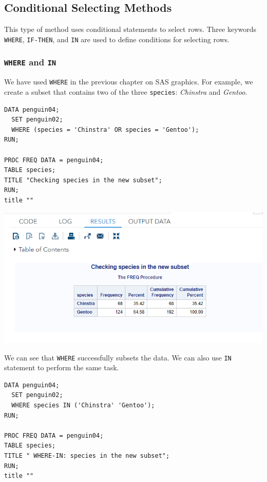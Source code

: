 \documentclass[
]{book}
\begin{document}
\hypertarget{conditional-selecting-methods}{%
\subsection{Conditional Selecting Methods}\label{conditional-selecting-methods}}

This type of method uses conditional statements to select rows. Three keywords \texttt{WHERE}, \texttt{IF-THEN}, and \texttt{IN} are used to define conditions for selecting rows.

\hypertarget{where-and-in}{%
\subsubsection{\texorpdfstring{\texttt{WHERE} and \texttt{IN}}{WHERE and IN}}\label{where-and-in}}

We have used \texttt{WHERE} in the previous chapter on SAS graphics. For example, we create a subset that contains two of the three \texttt{species}: \emph{Chinstra} and \emph{Gentoo}.

\begin{verbatim}
DATA penguin04;
  SET penguin02;
  WHERE (species = 'Chinstra' OR species = 'Gentoo');
RUN;

PROC FREQ DATA = penguin04;
TABLE species;
TITLE "Checking species in the new subset";
RUN;
title ""
\end{verbatim}

\begin{center}\includegraphics[width=1\linewidth]{img07/w07-penguinSpeciesWHERE} \end{center}

We can see that \texttt{WHERE} successfully subsets the data. We can also use \texttt{IN} statement to perform the same task.

\begin{verbatim}
DATA penguin04;
  SET penguin02;
  WHERE species IN ('Chinstra' 'Gentoo');
RUN;

PROC FREQ DATA = penguin04;
TABLE species;
TITLE " WHERE-IN: species in the new subset";
RUN;
title ""
\end{verbatim}
\end{document}
